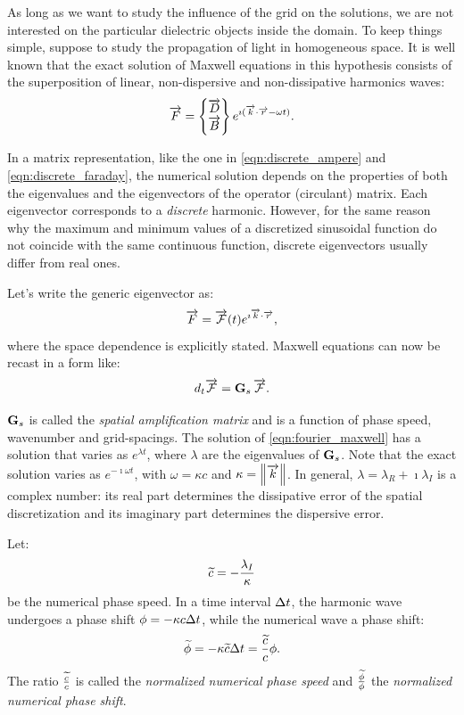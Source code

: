 As long as we want to study the influence of the grid on the
solutions, we are not interested on the particular dielectric objects
inside the domain. To keep things simple, suppose to study the
propagation of light in homogeneous space. It is well known that the
exact solution of Maxwell equations in this hypothesis consists of
the superposition of linear, non-dispersive and non-dissipative
harmonics waves:
\begin{equation} \label{eqn:fourier_maxwell_solution}
  \overrightarrow{F} = \begin{Bmatrix} \overrightarrow{D} \\ \overrightarrow{B} \end{Bmatrix} e^{\imath({\overrightarrow{k} \cdot \overrightarrow{r}} - \omega t)}.
\end{equation}

In a matrix representation, like the one in
\eqref{eqn:discrete_ampere} and \eqref{eqn:discrete_faraday}, the
numerical solution depends on the properties of both the eigenvalues
and the eigenvectors of the operator (circulant) matrix. Each
eigenvector corresponds to a \emph{discrete} harmonic. However, for
the same reason why the maximum and minimum values of a discretized
sinusoidal function do not coincide with the same continuous function,
discrete eigenvectors usually differ from real ones.

Let's write the generic eigenvector as:
\begin{equation*}
\overrightarrow{F} = \overrightarrow{\mathcal{F}}(t) e^{\imath {\overrightarrow{k}\cdot \overrightarrow{r}}},
\end{equation*}
where the space dependence is explicitly stated. Maxwell
equations can now be recast in a form like:
\begin{equation} \label{eqn:fourier_maxwell}
d_t \overrightarrow{\mathcal{F}} = {\mathbf{G}_s\,\overrightarrow{\mathcal{F}}}.
\end{equation}

$\mathbf{G}_s$ is called the \emph{spatial amplification matrix} and is a
function of phase speed, wavenumber and grid-spacings. The solution of
\eqref{eqn:fourier_maxwell} has a solution that varies as $e^{\lambda
  t}$, where $\lambda$ are the eigenvalues of $\mathbf{G}_s$. Note
that the exact solution varies as $e^{-\imath \omega t}$, with $\omega
= \kappa c$ and $\kappa = \left\lVert\overrightarrow{k}\right\rVert$. In general, $\lambda = \lambda_R
+ \imath \lambda_I$ is a complex number: its real part determines the
dissipative error of the spatial discretization and its imaginary part
determines the dispersive error.

Let:
\begin{equation*}
  \widetilde{c} = -\frac{\lambda_I}{\kappa}
\end{equation*}
be the numerical phase
speed. In a time interval $\Delta t$, the harmonic wave undergoes a
phase shift $\phi = -\kappa c \Delta t$, while the numerical wave a
phase shift:
\begin{equation*}
  \widetilde{\phi} = -\kappa \widetilde{c} \Delta t = \frac{\widetilde{c}}{c} \phi.
\end{equation*}
The ratio $\frac{\widetilde{c}}{c}$ is called the \emph{normalized
numerical phase speed} and $\frac{\widetilde{\phi}}{\phi}$ the \emph{normalized
numerical phase shift}.

